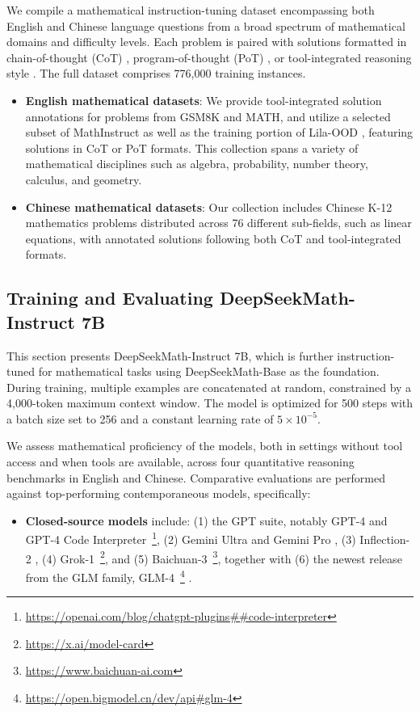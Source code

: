 We compile a mathematical instruction-tuning dataset encompassing both English and Chinese language questions from a broad spectrum of mathematical domains and difficulty levels. Each problem is paired with solutions formatted in chain-of-thought (CoT) \citep{cot}, program-of-thought (PoT) \citep{pot,pal}, or tool-integrated reasoning style \citep{tora}. The full dataset comprises 776,000 training instances.

\begin{itemize}[topsep=0pt]
    \item \textbf{English mathematical datasets}: We provide tool-integrated solution annotations for problems from GSM8K and MATH, and utilize a selected subset of MathInstruct \citep{MathInstruct} as well as the training portion of Lila-OOD \citep{lila}, featuring solutions in CoT or PoT formats. This collection spans a variety of mathematical disciplines such as algebra, probability, number theory, calculus, and geometry.
    \item \textbf{Chinese mathematical datasets}: Our collection includes Chinese K-12 mathematics problems distributed across 76 different sub-fields, such as linear equations, with annotated solutions following both CoT and tool-integrated formats.
\end{itemize}

\subsection{Training and Evaluating DeepSeekMath-Instruct 7B}

This section presents DeepSeekMath-Instruct 7B, which is further instruction-tuned for mathematical tasks using DeepSeekMath-Base as the foundation. During training, multiple examples are concatenated at random, constrained by a 4,000-token maximum context window. The model is optimized for 500 steps with a batch size set to 256 and a constant learning rate of $5 \times 10^{-5}$.

We assess mathematical proficiency of the models, both in settings without tool access and when tools are available, across four quantitative reasoning benchmarks in English and Chinese. Comparative evaluations are performed against top-performing contemporaneous models, specifically:

\begin{itemize}[topsep=0pt]
    \item \textbf{Closed-source models} include: (1) the GPT suite, notably GPT-4 \citep{gpt4} and GPT-4 Code Interpreter~\footnote{\url{https://openai.com/blog/chatgpt-plugins\#\#code-interpreter}}, (2) Gemini Ultra and Gemini Pro \citep{gemini}, (3) Inflection-2 \citep{inflection-2}, (4) Grok-1~\footnote{\url{https://x.ai/model-card}}, and (5) Baichuan-3~\footnote{\url{https://www.baichuan-ai.com}}, together with (6) the newest release from the GLM family, GLM-4~\footnote{\url{https://open.bigmodel.cn/dev/api\#glm-4}} \citep{glm}.
\end{itemize}

